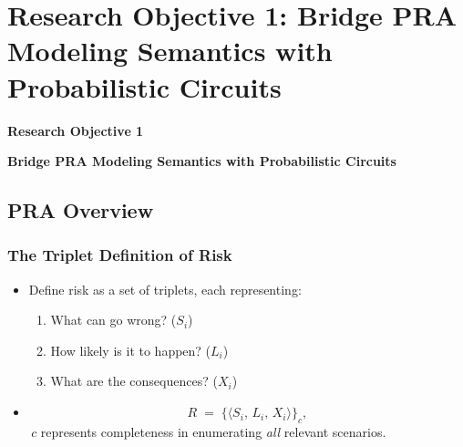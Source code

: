 
\section{Research Objective 1: Bridge PRA Modeling Semantics with Probabilistic Circuits}
\begin{frame}
    \Large{\centerline{\textbf{Research Objective 1}}}
    \vspace{6pt}
    \large{\centerline{\textbf{Bridge PRA Modeling Semantics with Probabilistic Circuits}}}
\end{frame}

\subsection{PRA Overview}
\begin{frame}[allowframebreaks]
\frametitle{The Triplet Definition of Risk}
\begin{itemize}
  \item Define risk as a set of triplets, each representing:
    \begin{enumerate}
      \item What can go wrong? (\(S_i\))
      \item How likely is it to happen? (\(L_i\))
      \item What are the consequences? (\(X_i\))
    \end{enumerate}
        \vspace{6pt}
  \item
    \begin{equation}
    \label{eq:risk_triplets_slides}
      R \;=\;\bigl\{\langle S_i,\,L_i,\,X_i\rangle\bigr\}_{c},
    \end{equation}
    \(\,c\) represents completeness in enumerating \emph{all} relevant scenarios.
\end{itemize}
\end{frame}

